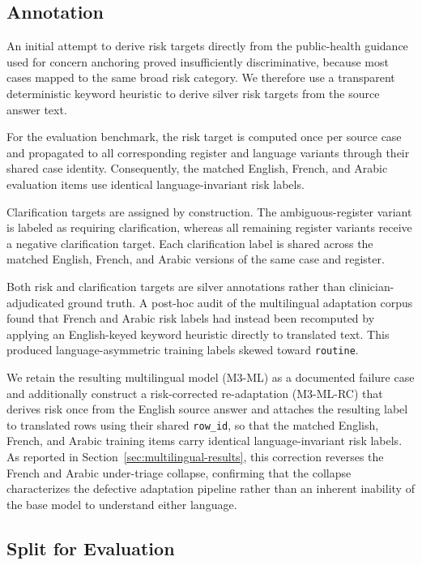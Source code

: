 \subsection{Annotation}
\label{sec:gold-labels}

An initial attempt to derive risk targets directly from the public-health
guidance used for concern anchoring proved insufficiently discriminative,
because most cases mapped to the same broad risk category. We therefore use a
transparent deterministic keyword heuristic to derive silver risk targets
from the source answer text.

For the evaluation benchmark, the risk target is computed once per source
case and propagated to all corresponding register and language variants
through their shared case identity. Consequently, the matched English,
French, and Arabic evaluation items use identical language-invariant risk
labels.

Clarification targets are assigned by construction. The ambiguous-register
variant is labeled as requiring clarification, whereas all remaining
register variants receive a negative clarification target. Each
clarification label is shared across the matched English, French, and Arabic
versions of the same case and register.

Both risk and clarification targets are silver annotations rather than
clinician-adjudicated ground truth. A post-hoc audit of the multilingual
adaptation corpus found that French and Arabic risk labels had instead been
recomputed by applying an English-keyed keyword heuristic directly to
translated text. This produced language-asymmetric training labels skewed
toward \texttt{routine}.

We retain the resulting multilingual model (M3-ML) as a documented failure
case and additionally construct a risk-corrected re-adaptation (M3-ML-RC)
that derives risk once from the English source answer and attaches the
resulting label to translated rows using their shared \texttt{row\_id}, so
that the matched English, French, and Arabic training items carry identical
language-invariant risk labels. As reported in
Section~\ref{sec:multilingual-results}, this correction reverses the French
and Arabic under-triage collapse, confirming that the collapse characterizes
the defective adaptation pipeline rather than an inherent inability of the
base model to understand either language.


\subsection{Split for Evaluation}

